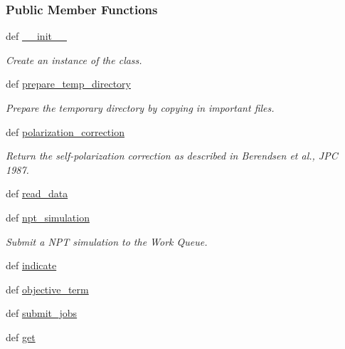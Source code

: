 \subsubsection*{\-Public \-Member \-Functions}
\begin{DoxyCompactItemize}
\item 
def \hyperlink{classforcebalance_1_1gmxio_1_1Liquid__GMX_a858330327e84a1186b9a932fe2437489}{\-\_\-\-\_\-init\-\_\-\-\_\-}
\begin{DoxyCompactList}\small\item\em \-Create an instance of the class. \end{DoxyCompactList}\item 
def \hyperlink{classforcebalance_1_1gmxio_1_1Liquid__GMX_a499a65278055bae95d3789ed74f6dc60}{prepare\-\_\-temp\-\_\-directory}
\begin{DoxyCompactList}\small\item\em \-Prepare the temporary directory by copying in important files. \end{DoxyCompactList}\item 
def \hyperlink{classforcebalance_1_1gmxio_1_1Liquid__GMX_a70a950655df19e6ed0365ba873fd0cc5}{polarization\-\_\-correction}
\begin{DoxyCompactList}\small\item\em \-Return the self-\/polarization correction as described in \-Berendsen et al., \-J\-P\-C 1987. \end{DoxyCompactList}\item 
def \hyperlink{classforcebalance_1_1liquid_1_1Liquid_a08b698af913d56f780d0587821c922cd}{read\-\_\-data}
\item 
def \hyperlink{classforcebalance_1_1liquid_1_1Liquid_a07a59f9f335693329b789a9c7608fc9f}{npt\-\_\-simulation}
\begin{DoxyCompactList}\small\item\em \-Submit a \-N\-P\-T simulation to the \-Work \-Queue. \end{DoxyCompactList}\item 
def \hyperlink{classforcebalance_1_1liquid_1_1Liquid_ae94ce30dfd0e92fdd6d746e6743be844}{indicate}
\item 
def \hyperlink{classforcebalance_1_1liquid_1_1Liquid_a00c23db61bcb86cc19f79dacdb2bc1f3}{objective\-\_\-term}
\item 
def \hyperlink{classforcebalance_1_1liquid_1_1Liquid_a716e28bb5572b3273036ac753b7e1e1d}{submit\-\_\-jobs}
\item 
def \hyperlink{classforcebalance_1_1liquid_1_1Liquid_a802c4139e5c002fabdeab5de88093880}{get}

\end{DoxyCompactItemize}
